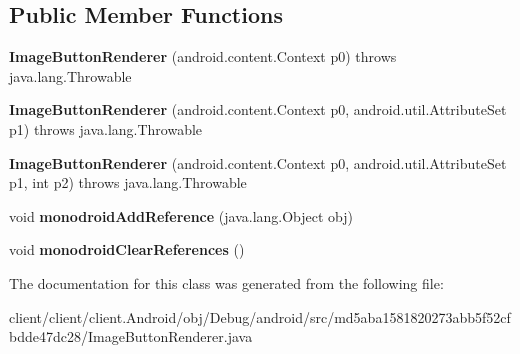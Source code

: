 \subsection*{Public Member Functions}
\begin{DoxyCompactItemize}
\item 
\hypertarget{classmd5aba1581820273abb5f52cfbdde47dc28_1_1ImageButtonRenderer_acfe34a762bb5fe3440c5d822a2630114}{}{\bfseries Image\+Button\+Renderer} (android.\+content.\+Context p0)  throws java.\+lang.\+Throwable 	\label{classmd5aba1581820273abb5f52cfbdde47dc28_1_1ImageButtonRenderer_acfe34a762bb5fe3440c5d822a2630114}

\item 
\hypertarget{classmd5aba1581820273abb5f52cfbdde47dc28_1_1ImageButtonRenderer_a1b40c7f6e59d0f003fea4fd37efda5e5}{}{\bfseries Image\+Button\+Renderer} (android.\+content.\+Context p0, android.\+util.\+Attribute\+Set p1)  throws java.\+lang.\+Throwable 	\label{classmd5aba1581820273abb5f52cfbdde47dc28_1_1ImageButtonRenderer_a1b40c7f6e59d0f003fea4fd37efda5e5}

\item 
\hypertarget{classmd5aba1581820273abb5f52cfbdde47dc28_1_1ImageButtonRenderer_a20d9cc0bd387f61b4bf96ec395d11d18}{}{\bfseries Image\+Button\+Renderer} (android.\+content.\+Context p0, android.\+util.\+Attribute\+Set p1, int p2)  throws java.\+lang.\+Throwable 	\label{classmd5aba1581820273abb5f52cfbdde47dc28_1_1ImageButtonRenderer_a20d9cc0bd387f61b4bf96ec395d11d18}

\item 
\hypertarget{classmd5aba1581820273abb5f52cfbdde47dc28_1_1ImageButtonRenderer_ab6b00a92fddac314e41e09285f3999a1}{}void {\bfseries monodroid\+Add\+Reference} (java.\+lang.\+Object obj)\label{classmd5aba1581820273abb5f52cfbdde47dc28_1_1ImageButtonRenderer_ab6b00a92fddac314e41e09285f3999a1}

\item 
\hypertarget{classmd5aba1581820273abb5f52cfbdde47dc28_1_1ImageButtonRenderer_abd58ff4f42df32fa281b79a02d86b754}{}void {\bfseries monodroid\+Clear\+References} ()\label{classmd5aba1581820273abb5f52cfbdde47dc28_1_1ImageButtonRenderer_abd58ff4f42df32fa281b79a02d86b754}

\end{DoxyCompactItemize}


The documentation for this class was generated from the following file\+:\begin{DoxyCompactItemize}
\item 
client/client/client.\+Android/obj/\+Debug/android/src/md5aba1581820273abb5f52cfbdde47dc28/Image\+Button\+Renderer.\+java\end{DoxyCompactItemize}
